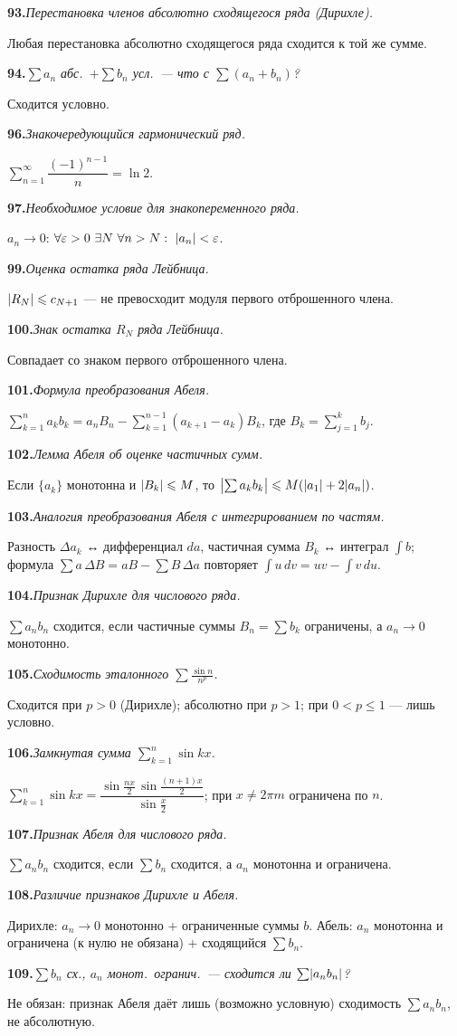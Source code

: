 \documentclass[10pt,a4paper]{article}
\newcommand{\eps}{\varepsilon}
\renewcommand{\le}{\leqslant}
\DeclarePairedDelimiter{\abs}{\lvert}{\rvert}
\theoremstyle{definition}
\theoremstyle{plain}
\newcommand{\writespace}{\vspace{7.5mm}}
\newcommand{\faq}[3]{%
  \par\smallskip\noindent
  \textbf{#1.}\enspace\textit{#2}\par
  \nobreak\vspace{0.3ex}\noindent #3\par
  \writespace}
\begin{document}
\faq{93}{Перестановка членов абсолютно сходящегося ряда (Дирихле).}{%
Любая перестановка абсолютно сходящегося ряда сходится к той же сумме.}

\faq{94}{$\sum a_n$ абс.\ $+\sum b_n$ усл.\ — что с $\sum(a_n+b_n)$?}{%
Сходится условно.}

\faq{96}{Знакочередующийся гармонический ряд.}{%
$\sum_{n=1}^\infty\dfrac{(-1)^{n-1}}{n}=\ln2$.}

\faq{97}{Необходимое условие для знакопеременного ряда.}{%
$a_n\to0$: $\forall\eps>0\ \exists N\ \forall n>N:\ \abs{a_n}<\eps$.}

\faq{99}{Оценка остатка ряда Лейбница.}{%
$\abs{R_N}\le c_{N+1}$ — не превосходит модуля первого отброшенного члена.}

\faq{100}{Знак остатка $R_N$ ряда Лейбница.}{%
Совпадает со знаком первого отброшенного члена.}

\faq{101}{Формула преобразования Абеля.}{%
$\sum_{k=1}^n a_k b_k=a_n B_n-\sum_{k=1}^{n-1}(a_{k+1}-a_k)B_k$, где $B_k=\sum_{j=1}^k b_j$.}

\faq{102}{Лемма Абеля об оценке частичных сумм.}{%
Если $\{a_k\}$ монотонна и $\abs{B_k}\le M$, то $\abs[\big]{\sum a_k b_k}\le M(\abs{a_1}+2\abs{a_n})$.}

\faq{103}{Аналогия преобразования Абеля с интегрированием по частям.}{%
Разность $\Delta a_k$ ↔ дифференциал $da$, частичная сумма $B_k$ ↔ интеграл $\int b$; формула
$\sum a\,\Delta B=aB-\sum B\,\Delta a$ повторяет $\int u\,dv=uv-\int v\,du$.}

\faq{104}{Признак Дирихле для числового ряда.}{%
$\sum a_n b_n$ сходится, если частичные суммы $B_n=\sum b_k$ ограничены, а $a_n\to0$ монотонно.}

\faq{105}{Сходимость эталонного $\sum\frac{\sin n}{n^p}$.}{%
Сходится при $p>0$ (Дирихле); абсолютно при $p>1$; при $0<p\le1$ — лишь условно.}

\faq{106}{Замкнутая сумма $\sum_{k=1}^n\sin kx$.}{%
$\sum_{k=1}^n\sin kx=\dfrac{\sin\frac{nx}2\,\sin\frac{(n+1)x}2}{\sin\frac x2}$; при $x\ne2\pi m$
ограничена по $n$.}

\faq{107}{Признак Абеля для числового ряда.}{%
$\sum a_n b_n$ сходится, если $\sum b_n$ сходится, а $a_n$ монотонна и ограничена.}

\faq{108}{Различие признаков Дирихле и Абеля.}{%
Дирихле: $a_n\to0$ монотонно $+$ ограниченные суммы $b$. Абель: $a_n$ монотонна и ограничена (к
нулю не обязана) $+$ сходящийся $\sum b_n$.}

\faq{109}{$\sum b_n$ сх., $a_n$ монот.\ огранич.\ — сходится ли $\sum\abs{a_n b_n}$?}{%
Не обязан: признак Абеля даёт лишь (возможно условную) сходимость $\sum a_n b_n$, не абсолютную.}
\end{document}

